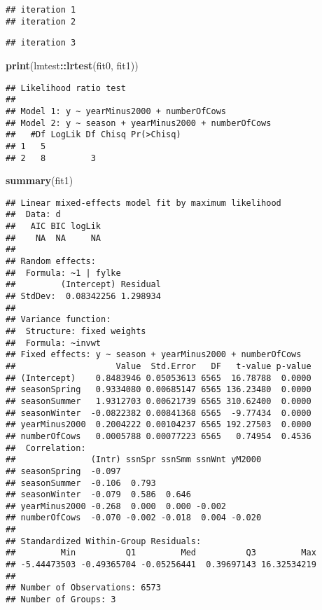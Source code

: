 \documentclass[]{book}
\newenvironment{Shaded}{\begin{snugshade}}{\end{snugshade}}
\newcommand{\KeywordTok}[1]{\textcolor[rgb]{0.13,0.29,0.53}{\textbf{#1}}}
\newcommand{\OperatorTok}[1]{\textcolor[rgb]{0.81,0.36,0.00}{\textbf{#1}}}
\newcommand{\NormalTok}[1]{#1}
\begin{document}
\begin{verbatim}
## iteration 1
## iteration 2
\end{verbatim}

\begin{verbatim}
## iteration 3
\end{verbatim}

\begin{Shaded}
\begin{Highlighting}[]
\KeywordTok{print}\NormalTok{(lmtest}\OperatorTok{::}\KeywordTok{lrtest}\NormalTok{(fit0, fit1))}
\end{Highlighting}
\end{Shaded}

\begin{verbatim}
## Likelihood ratio test
## 
## Model 1: y ~ yearMinus2000 + numberOfCows
## Model 2: y ~ season + yearMinus2000 + numberOfCows
##   #Df LogLik Df Chisq Pr(>Chisq)
## 1   5                           
## 2   8         3
\end{verbatim}

\begin{Shaded}
\begin{Highlighting}[]
\KeywordTok{summary}\NormalTok{(fit1)}
\end{Highlighting}
\end{Shaded}

\begin{verbatim}
## Linear mixed-effects model fit by maximum likelihood
##  Data: d 
##   AIC BIC logLik
##    NA  NA     NA
## 
## Random effects:
##  Formula: ~1 | fylke
##         (Intercept) Residual
## StdDev:  0.08342256 1.298934
## 
## Variance function:
##  Structure: fixed weights
##  Formula: ~invwt 
## Fixed effects: y ~ season + yearMinus2000 + numberOfCows 
##                    Value  Std.Error   DF   t-value p-value
## (Intercept)    0.8483946 0.05053613 6565  16.78788  0.0000
## seasonSpring   0.9334080 0.00685147 6565 136.23480  0.0000
## seasonSummer   1.9312703 0.00621739 6565 310.62400  0.0000
## seasonWinter  -0.0822382 0.00841368 6565  -9.77434  0.0000
## yearMinus2000  0.2004222 0.00104237 6565 192.27503  0.0000
## numberOfCows   0.0005788 0.00077223 6565   0.74954  0.4536
##  Correlation: 
##               (Intr) ssnSpr ssnSmm ssnWnt yM2000
## seasonSpring  -0.097                            
## seasonSummer  -0.106  0.793                     
## seasonWinter  -0.079  0.586  0.646              
## yearMinus2000 -0.268  0.000  0.000 -0.002       
## numberOfCows  -0.070 -0.002 -0.018  0.004 -0.020
## 
## Standardized Within-Group Residuals:
##         Min          Q1         Med          Q3         Max 
## -5.44473503 -0.49365704 -0.05256441  0.39697143 16.32534219 
## 
## Number of Observations: 6573
## Number of Groups: 3
\end{verbatim}
\end{document}
